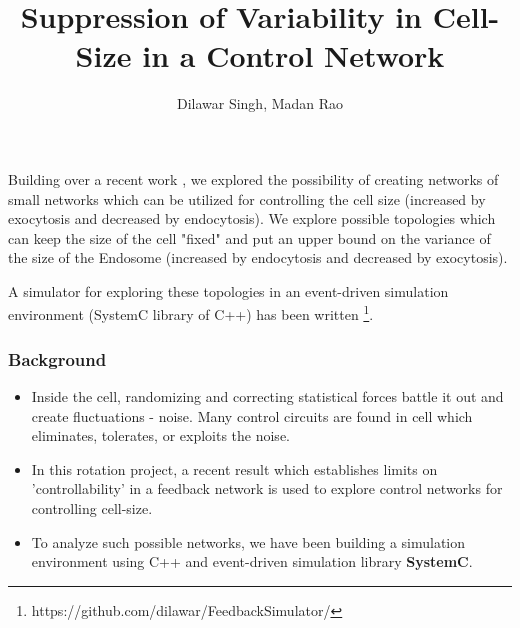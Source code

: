 \documentclass{beamer}
\title{Suppression of Variability in Cell-Size in a Control Network}
\author{Dilawar Singh, Madan Rao}
\begin{document}
\begin{frame}

    \maketitle

    Building over a recent work \cite{paulsson}, we explored the possibility of
    creating networks of small networks which can be utilized for controlling
    the cell size (increased by exocytosis and decreased by endocytosis). We
    explore possible topologies which can keep the size of the cell "fixed" and
    put an upper bound on the variance of the size of the Endosome (increased by
    endocytosis and decreased by exocytosis). 
    
    A simulator for exploring these topologies in an event-driven simulation
    environment (SystemC library of C++) has been written
    \footnote{https://github.com/dilawar/FeedbackSimulator/}.

\end{frame}

\begin{frame}
    \frametitle{Background}

    \begin{itemize} 

        \item Inside the cell, randomizing and correcting statistical forces
            battle it out and create fluctuations - noise. Many control
            circuits are found in cell which eliminates, tolerates, or exploits the noise.  

        \item In this rotation project, a recent result \cite{paulsson} which
            establishes limits on 'controllability' in a feedback network is
            used to explore control networks for controlling cell-size.

        \item To analyze such possible networks, we have been building a
            simulation environment using C++ and event-driven simulation library
            \textbf{SystemC}.

    \end{itemize}

    
\end{frame}
\end{document}
